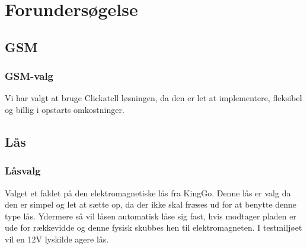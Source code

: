 \chapter{Forundersøgelse}

\section{GSM}

\subsection{GSM-valg}
Vi har valgt at bruge Clickatell løsningen, da den er let at implementere, fleksibel og billig i opstarts omkostninger.

\newpage
\section{Lås}

\subsection{Låsvalg}
Valget et faldet på den elektromagnetiske lås fra KingGo. Denne lås er valg da den er simpel og let at sætte op, da der ikke skal fræses ud for at benytte denne type lås. Ydermere så vil låsen automatisk låse sig fast, hvis modtager pladen er ude for rækkevidde og denne fysisk skubbes hen til elektromagneten. I testmiljøet vil en 12V lyskilde agere lås.